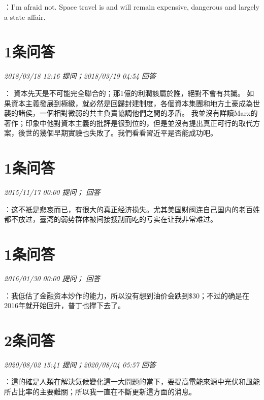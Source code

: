 \documentclass[twocolumn]{ctexart}
\begin{document}
：I'm afraid not. Space travel is and will remain expensive, dangerous and largely a state affair.\\

\section{1条问答}

\textit{\hfill\noindent\small 2018/03/18 12:16 提问；2018/03/19 04:54 回答}

：
資本先天是不可能完全聯合的；那1億的利潤該屬於誰，絕對不會有共識。
如果資本主義發展到極緻，就必然是回歸封建制度，各個資本集團和地方土豪成為世襲的諸侯，一個相對微弱的共主負責協調他們之間的矛盾。
我並沒有詳讀Marx的著作；印象中他對資本主義的批評是很到位的，但是並沒有提出真正可行的取代方案，後世的幾個早期實驗也失敗了。我們看看習近平是否能成功吧。
\\

\section{1条问答}

\textit{\hfill\noindent\small 2015/11/17 00:00 提问； 回答}

：这不衹是悲哀而已，有很大的真正经济损失。尤其美国财阀连自己国内的老百姓都不放过，臺湾的弱势群体被间接搜刮而吃的亏实在让我非常难过。\\

\section{1条问答}

\textit{\hfill\noindent\small 2016/01/30 00:00 提问； 回答}

：我低估了金融资本炒作的能力，所以没有想到油价会跌到\$30；不过的确是在2016年就开始回升，普丁也撑下去了。\\

\section{2条问答}

\textit{\hfill\noindent\small 2020/08/02 15:41 提问；2020/08/04 05:57 回答}

：這的確是人類在解決氣候變化這一大問題的當下，要提高電能來源中光伏和風能所占比率的主要難關；所以我一直在不斷更新這方面的消息。
\end{document}
